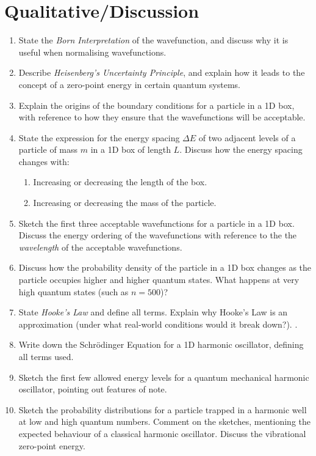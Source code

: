 \documentclass{memoir}[11pt,oneside,a4paper,openany]
\begin{document}
\section*{Qualitative/Discussion}
\begin{enumerate}
	\item State the \emph{Born Interpretation} of the wavefunction, and discuss why it is useful when normalising wavefunctions.
	\item Describe \emph{Heisenberg's Uncertainty Principle}, and explain how it leads to the concept of a zero-point energy in certain quantum systems.
	\item Explain the origins of the boundary conditions for a particle in a 1D box, with reference to how they ensure that the wavefunctions will be acceptable.
	\item State the expression for the energy spacing $\Delta E$ of two adjacent levels of a particle of mass $m$ in a 1D box of length $L$. Discuss how the energy spacing changes with:
	\begin{enumerate}
		\item Increasing or decreasing the length of the box.
		\item Increasing or decreasing the mass of the particle.
	\end{enumerate}
	\item Sketch the first three acceptable wavefunctions for a particle in a 1D box. Discuss the energy ordering of the wavefunctions with reference to the the \emph{wavelength} of the acceptable wavefunctions.
	\item Discuss how the probability density of the particle in a 1D box changes as the particle occupies higher and higher quantum states. What happens at very high quantum states (such as $n=500$)?
	\item State \emph{Hooke's Law} and define all terms. Explain why Hooke's Law is an approximation (under what real-world conditions would it break down?). .
	\item Write down the Schr{\"o}dinger Equation for a 1D harmonic oscillator, defining all terms used. 
	\item Sketch the first few allowed energy levels for a quantum mechanical harmonic oscillator, pointing out features of note.
	\item Sketch the probability distributions for a particle trapped in a harmonic well at low and high quantum numbers. Comment on the sketches, mentioning the expected behaviour of a classical harmonic oscillator. Discuss the vibrational zero-point energy. 

\end{enumerate}
\end{document}
